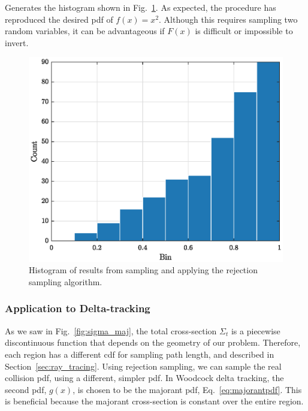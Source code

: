 Generates the histogram shown in Fig.~\ref{fig:pdf_histogram}. As
expected, the procedure has reproduced the desired \gls{pdf} of $f(x)
= x^2$. Although this requires sampling two random variables, it can be
advantageous if $F(x)$ is difficult or impossible to invert.
\begin{figure}[hbtp]
  \centering
  \includegraphics[scale=0.75]{images/pdf_histogram}
  \caption{Histogram of results from sampling and applying the
    rejection sampling algorithm.}
  \label{fig:pdf_histogram}
\end{figure}
\subsubsection{Application to Delta-tracking}
\label{sec:application_to_delta-tracking}

As we saw in Fig.~\ref{fig:sigma_maj}, the total cross-section
$\Sigma_t$ is a piecewise discontinuous function that depends on the
geometry of our problem. Therefore, each region has a different
\gls{cdf} for sampling path length, and described in
Section~\ref{sec:ray_tracing}. Using rejection sampling, we can sample
the real collision \gls{pdf}, using a different, simpler \gls{pdf}.
In Woodcock delta tracking, the second \gls{pdf}, $g(x)$, is chosen to
be the majorant \gls{pdf}, Eq.~\eqref{eq:majorantpdf}. This is
beneficial because the majorant cross-section is constant over the
entire region.

